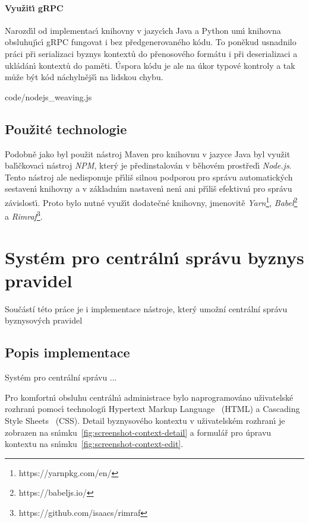 \paragraph{Využit\'{\i} gRPC} Narozd\'{\i}l od implementac\'{\i} knihovny
v jazyc\'{\i}ch Java a Python um\'{\i} knihovna obsluhuj\'{\i}c\'{\i} gRPC
fungovat i bez předgenerovaného kódu. To poněkud usnadnilo
práci při serializaci byznys kontextů do přenosového formátu
i při deserializaci a ukládán\'{\i} kontextů do paměti. Úspora
kódu je ale na úkor typové kontroly a tak může b\'yt kód náchylnějš\'{\i}
na lidskou chybu.


{code/nodejs_weaving.js}

\subsection{Použité technologie}

Podobně jako byl použit nástroj Maven pro knihovnu v jazyce Java byl
využit bal\'{\i}čkovac\'{\i} nástroj \textit{NPM}, kter\'y je předinstalován
v běhovém prostřed\'{\i} \textit{Node.js}. Tento nástroj ale nedisponuje
př\'{\i}liš silnou podporou pro správu automatick\'ych sestaven\'{\i} knihovny
a v základn\'{\i}m nastaven\'{\i} nen\'{\i} ani př\'{\i}liš efektivn\'{\i} pro správu závislost\'{\i}.
Proto bylo nutné využ\'{\i}t dodatečné knihovny, jmenovitě
\textit{Yarn}\footnote{https://yarnpkg.com/en/}, \textit{Babel}\footnote{https://babeljs.io/} a
\textit{Rimraf}\footnote{https://github.com/isaacs/rimraf}.

\section{Systém pro centráln\'{\i} správu byznys pravidel}\label{sec:central-administration}

Součástí této práce je i implementace nástroje, který umožní centrální správu byznysových
pravidel
\subsection{Popis implementace}

Systém pro centrální správu ...

Pro komfortn\'{\i} obsluhu centráln\'{\i} administrace bylo naprogramováno
uživatelské rozhran\'{\i} pomoc\'{\i} technologi\'{\i} Hypertext Markup Language~\cite{berners1995hypertext}
(HTML) a Cascading Style Sheets~\cite{bos1998cascading} (\gls{CSS}).
Detail byznysového kontextu v uživatelském rozhran\'{\i} je zobrazen
na sn\'{\i}mku~\ref{fig:screenshot-context-detail} a formulář pro úpravu kontextu
na sn\'{\i}mku~\ref{fig:screenshot-context-edit}.

